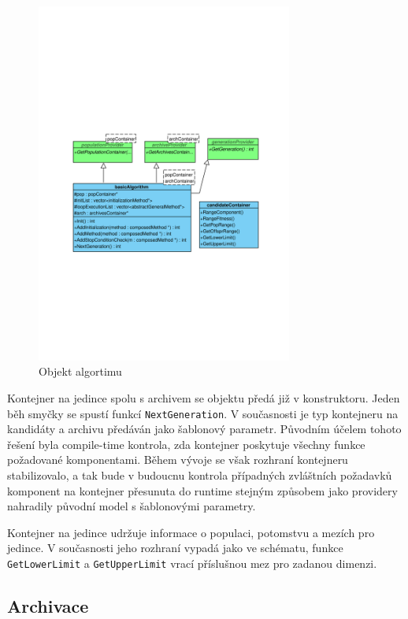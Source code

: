 \begin{figure}[h!]
\begin{center}
  \includegraphics[width=0.75\textwidth]{img/population}
  \caption{Objekt algortimu}\label{population}
  \end{center}
\end{figure}

Kontejner na jedince spolu s archivem se objektu předá již v konstruktoru. Jeden běh smyčky se spustí funkcí \texttt{NextGeneration}. V současnosti je typ kontejneru na kandidáty a archivu předáván jako šablonový parametr. Původním účelem tohoto řešení byla compile-time kontrola, zda kontejner poskytuje všechny funkce požadované komponentami. Během vývoje se však rozhraní kontejneru stabilizovalo, a tak bude v budoucnu kontrola případných zvláštních požadavků komponent na kontejner přesunuta do runtime stejným způsobem jako providery nahradily původní model s šablonovými parametry.

Kontejner na jedince udržuje informace o populaci, potomstvu a mezích pro jedince. V současnosti jeho rozhraní vypadá jako ve schématu, funkce \texttt{GetLowerLimit} a \texttt{GetUpperLimit} vrací příslušnou mez pro zadanou dimenzi.

\subsection{Archivace}


